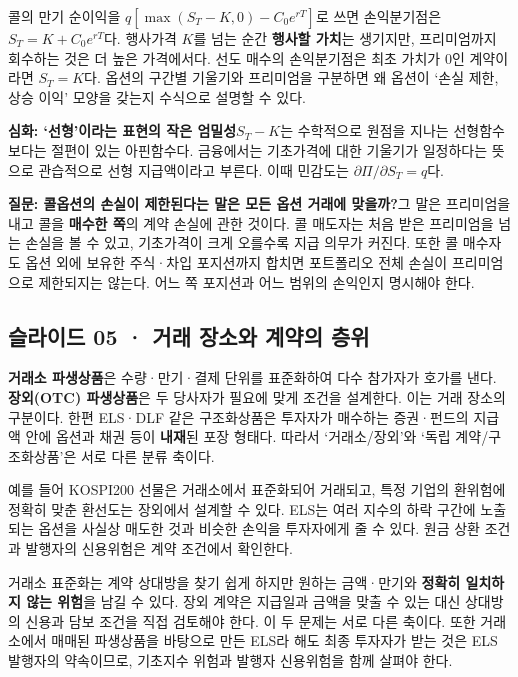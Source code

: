 \documentclass[11pt,a4paper]{article}
\begin{document}
콜의 만기 순이익을 $q[\max(S_T-K,0)-C_0e^{rT}]$로 쓰면 손익분기점은 $S_T=K+C_0e^{rT}$다. 행사가격 $K$를 넘는 순간 \textbf{행사할 가치}는 생기지만, 프리미엄까지 회수하는 것은 더 높은 가격에서다. 선도 매수의 손익분기점은 최초 가치가 0인 계약이라면 $S_T=K$다. 옵션의 구간별 기울기와 프리미엄을 구분하면 왜 옵션이 ‘손실 제한, 상승 이익’ 모양을 갖는지 수식으로 설명할 수 있다.\par

\par\medskip\noindent\textbf{심화: ‘선형’이라는 표현의 작은 엄밀성}\quad $S_T-K$는 수학적으로 원점을 지나는 선형함수보다는 절편이 있는 아핀함수다. 금융에서는 기초가격에 대한 기울기가 일정하다는 뜻으로 관습적으로 선형 지급액이라고 부른다. 이때 민감도는 $\partial\Pi/\partial S_T=q$다.\par

\par\medskip\noindent\textbf{질문: 콜옵션의 손실이 제한된다는 말은 모든 옵션 거래에 맞을까?}\quad 그 말은 프리미엄을 내고 콜을 \textbf{매수한 쪽}의 계약 손실에 관한 것이다. 콜 매도자는 처음 받은 프리미엄을 넘는 손실을 볼 수 있고, 기초가격이 크게 오를수록 지급 의무가 커진다. 또한 콜 매수자도 옵션 외에 보유한 주식·차입 포지션까지 합치면 포트폴리오 전체 손실이 프리미엄으로 제한되지는 않는다. 어느 쪽 포지션과 어느 범위의 손익인지 명시해야 한다.\par

\subsection{슬라이드 05 · 거래 장소와 계약의 층위}
\textbf{거래소 파생상품}은 수량·만기·결제 단위를 표준화하여 다수 참가자가 호가를 낸다. \textbf{장외(OTC) 파생상품}은 두 당사자가 필요에 맞게 조건을 설계한다. 이는 거래 장소의 구분이다. 한편 ELS·DLF 같은 구조화상품은 투자자가 매수하는 증권·펀드의 지급액 안에 옵션과 채권 등이 \textbf{내재}된 포장 형태다. 따라서 ‘거래소/장외’와 ‘독립 계약/구조화상품’은 서로 다른 분류 축이다.\par

예를 들어 KOSPI200 선물은 거래소에서 표준화되어 거래되고, 특정 기업의 환위험에 정확히 맞춘 환선도는 장외에서 설계할 수 있다. ELS는 여러 지수의 하락 구간에 노출되는 옵션을 사실상 매도한 것과 비슷한 손익을 투자자에게 줄 수 있다. 원금 상환 조건과 발행자의 신용위험은 계약 조건에서 확인한다.\par

거래소 표준화는 계약 상대방을 찾기 쉽게 하지만 원하는 금액·만기와 \textbf{정확히 일치하지 않는 위험}을 남길 수 있다. 장외 계약은 지급일과 금액을 맞출 수 있는 대신 상대방의 신용과 담보 조건을 직접 검토해야 한다. 이 두 문제는 서로 다른 축이다. 또한 거래소에서 매매된 파생상품을 바탕으로 만든 ELS라 해도 최종 투자자가 받는 것은 ELS 발행자의 약속이므로, 기초지수 위험과 발행자 신용위험을 함께 살펴야 한다.\par
\end{document}
